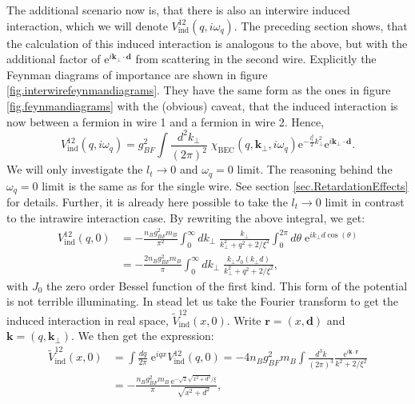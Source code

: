 The additional scenario now is, that there is also an interwire induced interaction, which we will denote $V_{\text{ind}}^{12}(q,i\omega_q)$. The preceding section shows, that the calculation of this induced interaction is analogous to the above, but with the additional factor of $\text{e}^{i\mathbf{k}_\perp\cdot \mathbf{d}}$ from scattering in the second wire. Explicitly the Feynman diagrams of importance are shown in figure \ref{fig.interwirefeynmandiagrams}. They have the same form as the ones in figure \ref{fig.feynmandiagrams} with the (obvious) caveat, that the induced interaction is now between a fermion in wire 1 and a fermion in wire 2. Hence,
\begin{equation}
V_{\text{ind}}^{12}(q,i\omega_q) = g_{BF}^2\int\frac{d^2k_\perp}{(2\pi)^2}\; \chi_\text{BEC}(q,\mathbf{k}_\perp,i\omega_q)\text{e}^{-\frac{l_t^2}{2}k_\perp^2}\text{e}^{i\mathbf{k}_\perp\cdot \mathbf{d}}. 
\label{eq.VFF12indXBEC} 
\end{equation}
We will only investigate the $l_t \to 0$ and $\omega_q = 0$ limit. The reasoning behind the $\omega_q = 0$ limit is the same as for the single wire. See section \ref{sec.RetardationEffects} for details. Further, it is already here possible to take the $l_t \to 0$ limit in contrast to the intrawire interaction case. By rewriting the above integral, we get:
\begin{align}
V_{\text{ind}}^{12}(q,0) &= -\frac{n_Bg_{BF}^2m_B}{\pi^2}\int_0^\infty d k_\perp \; \frac{k_\perp}{k_\perp^2 + q^2 + 2/\xi^2} \int_0^{2\pi} d\theta \; \text{e}^{ik_\perp d\cos(\theta)} \nonumber \\
						  &= -\frac{2n_Bg_{BF}^2m_B}{\pi}\int_0^\infty d k_\perp \; \frac{k_\perp J_0(k_\perp d)}{k_\perp^2 + q^2 + 2/\xi^2},
\label{eq.secondwireinducedinteractionmomentumspaceintegralexpression}
\end{align}
with $J_0$ the zero order Bessel function of the first kind. This form of the potential is not terrible illuminating. In stead let us take the Fourier transform to get the induced interaction in real space, $\tilde{V}_{\text{ind}}^{12}(x,0)$. Write $\mathbf{r} = (x,\mathbf{d})$ and $\mathbf{k} = (q,\mathbf{k}_\perp)$. We then get the expression:
\begin{align}
\tilde{V}_{\text{ind}}^{12}(x,0) &= \int \frac{dq}{2\pi} \; \text{e}^{iqx} V_{\text{ind}}^{12}(q,0) = -4n_Bg^2_{BF}m_B\int \frac{d^3k}{(2\pi)^3} \frac{\text{e}^{i\mathbf{k}\cdot \mathbf{r}}}{k^2 + 2/\xi^2} \nonumber \\
								  &= -\frac{n_Bg^2_{BF}m_B}{\pi} \frac{\text{e}^{-\sqrt{2}\sqrt{x^2+d^2}/\xi}}{\sqrt{x^2+d^2}},
\end{align}
